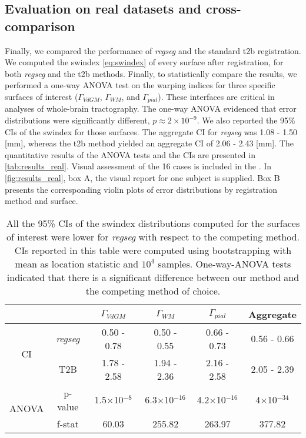 \subsection{Evaluation on real datasets and cross-comparison}\label{sec:results_hcp}
%
Finally, we compared the performance of \emph{regseg} and the standard \gls*{t2b}
  registration.
We computed the \gls*{swindex} \eqref{eq:swindex} of every surface after registration,
  for both \emph{regseg} and the \gls*{t2b} methods.
Finally, to statistically compare the results, we performed a one-way ANOVA test
  on the warping indices for three specific surfaces of interest
  ($\Gamma_{VdGM}$, $\Gamma_{WM}$, and $\Gamma_{pial}$).
These interfaces are critical in analyses of whole-brain tractography.
The one-way ANOVA evidenced that error distributions were significantly different,
  $p \approx 2 \times 10^{-9}$.
We also reported the 95\% CIs of the \gls*{swindex} for those surfaces.
The aggregate CI for \emph{regseg} was 1.08 - 1.50 [mm], whereas the \gls*{t2b} method
  yielded an aggregate CI of 2.06 - 2.43 [mm].
The quantitative results of the ANOVA tests and the CIs are presented in \autoref{tab:results_real}.
Visual assessment of the 16 cases is included in the .
In \autoref{fig:results_real}, box A, the visual report for one subject is supplied.
Box B presents the corresponding violin plots of error distributions by registration method
  and surface.

\begin{table}
		\centering
		\footnotesize
		\tabcolsep=0.05cm
    \begin{tabular}{cccccc}
    & & $\Gamma_{VdGM}$  & $\Gamma_{WM}$ & $\Gamma_{pial}$ & Aggregate \\
    \hline
    \multirow{2}{*}{CI}
       & \emph{regseg}        & 0.50 - 0.78 & 0.50 - 0.55 & 0.66 - 0.73 & 0.56 - 0.66 \\
       & T2B                  & 1.78 - 2.58 & 1.94 - 2.36 & 2.16 - 2.58 & 2.05 - 2.39 \\
    \hline
    \multirow{2}{*}{ANOVA}
       & p-value  & 1.5$\times$10$^{-8}$& 6.3$\times$10$^{-16}$& 4.2$\times$10$^{-16}$ & 4$\times$10$^{-34}$ \\
       & f-stat   & 60.03               & 255.82               & 263.97                & 377.82              \\
    \hline
    \end{tabular}
    \caption{All the 95\% CIs of the \gls*{swindex} distributions computed for the
      surfaces of interest were lower for \emph{regseg} with respect to the competing
      method.
    CIs reported in this table were computed using bootstrapping with mean as location
      statistic and $10^4$ samples.
    One-way-ANOVA tests indicated that there is a significant difference between our method and
      the competing method of choice.
    }\label{tab:results_real}
\end{table}

